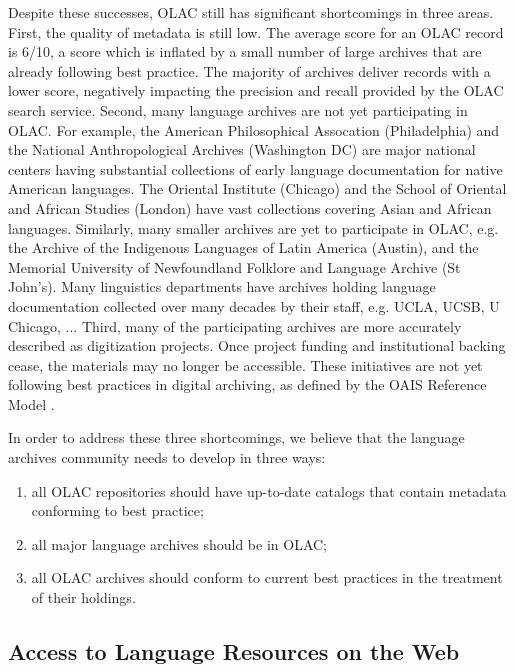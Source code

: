 Despite these successes, OLAC still has significant shortcomings in
three areas.
First, the quality of metadata is still low.  The average score for an
OLAC record is 6/10, a score which is inflated by a small number of
large archives that are already following best practice.  The majority
of archives deliver records with a lower score, negatively impacting
the precision and recall provided by the OLAC search service.
Second, many language archives are not yet participating in OLAC.  For
example, the American Philosophical Assocation (Philadelphia) and the
National Anthropological Archives (Washington DC) are major national
centers having substantial collections of early language documentation
for native American languages.  The Oriental Institute (Chicago) and
the School of Oriental and African Studies (London) have vast
collections covering Asian and African languages.  Similarly, many
smaller archives are yet to participate in OLAC, e.g. the
Archive of the Indigenous Languages of Latin America (Austin), and the
Memorial University of Newfoundland Folklore and Language Archive (St
John's).  Many linguistics departments have archives holding language
documentation collected over many decades by their staff, e.g. UCLA,
UCSB, U Chicago, ...
Third, many of the participating archives are more accurately described
as digitization projects.  Once project funding and institutional
backing cease, the materials may no longer be accessible.  These
initiatives are not yet following best practices in digital archiving,
as defined by the OAIS Reference Model \citep{OAIS02}.


In order to address these three shortcomings, we believe that the
language archives community needs to develop in three ways:

\begin{enumerate}\setlength{\itemsep}{0pt}
\item all OLAC repositories should have up-to-date catalogs
      that contain metadata conforming to best practice;
\item all major language archives should be in OLAC;
\item all OLAC archives should conform to current best practices
      in the treatment of their holdings.
\end{enumerate}

\subsection{Access to Language Resources on the Web}

